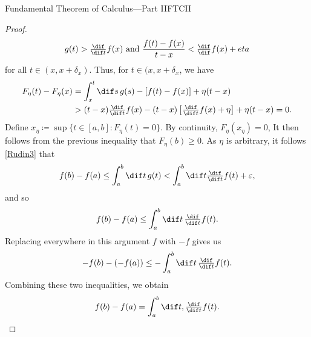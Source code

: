 \begin{thm}{Fundamental Theorem of Calculus---Part II}{FTCII}
\begin{proof}
\begin{equation}
g(t)>\tfrac{\dif}{\dif t}f(x)\text{ and }\frac{f(t)-f(x)}{t-x}<\tfrac{\dif}{\dif }f(x)+eta
\end{equation}
for all $t\in (x,x+\delta _x)$.  Thus, for $t\in (x,x+\delta _x$, we have
\begin{equation}\begin{split}
F_\eta (t)-F_\eta (x) & =\int _x^t\dif s\, g(s)-[f(t)-f(x)]+\eta (t-x) \\
& >(t-x)\tfrac{\dif}{\dif t}f(x)-(t-x)\left[ \tfrac{\dif}{\dif t}f(x)+\eta \right] +\eta (t-x)=0.
\end{split}
\end{equation}
Define $x_\eta \coloneqq \sup \{ t\in [a,b]:F_\eta (t)=0\}$.  By continuity, $F_\eta (x_\eta )=0$,   It then follows from the previous inequality that $F_\eta (b)\geq 0$.  As $\eta$ is arbitrary, it follows \eqref{Rudin3} that
\begin{equation}
f(b)-f(a)\leq \int _a^b\dif t\, g(t)<\int _a^b\dif t\tfrac{\dif}{\dif t}f(t)+\varepsilon ,
\end{equation}
and so
\begin{equation}
f(b)-f(a)\leq \int _a^b\dif t\, \tfrac{\dif}{\dif t}f(t).
\end{equation}
Replacing everywhere in this argument $f$ with $-f$ gives us
\begin{equation}
-f(b)-(-f(a))\leq -\int _a^b\dif t\, \tfrac{\dif}{\dif t}f(t).
\end{equation}
Combining these two inequalities, we obtain
\begin{equation}
f(b)-f(a)=\int _a^b\dif t, \tfrac{\dif}{\dif t}f(t).
\end{equation}
\end{proof}
\end{thm}

